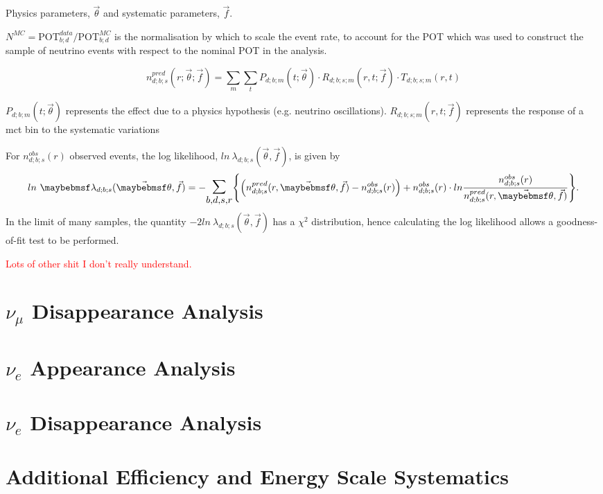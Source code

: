 Physics parameters, $\vec{\theta}$ and systematic parameters, $\vec{f}$.

$N^{MC} = \mbox{POT}_{b;d}^{data}/\mbox{POT}_{b;d}^{MC}$ is the normalisation by which to scale the event rate, to account for the POT which was used to construct the sample of neutrino events with respect to the nominal POT in the analysis.

\begin{equation}
n_{d;b;s}^{pred}(r; \vec{\theta}; \vec{f}) =
   \sum_{m} \sum_{t}  P_{d;b;m}(t; \vec{\theta}) \cdot R_{d;b;s;m}(r,t; \vec{f}) \cdot T_{d;b;s;m}(r,t)
\label{eq:valor_npred}
\end{equation}

$P_{d;b;m}(t; \vec{\theta})$ represents the effect due to a physics hypothesis (e.g. neutrino oscillations).
$R_{d;b;s;m}(r,t; \vec{f})$ represents the response of a \gls{mct} bin to the systematic variations


 For $n_{d ; b ; s}^{obs}(r)$ observed events, the log likelihood, $ln~\lambda_{d;b;s}(\vec \theta, \vec f)$, is given by
\begin{equation}
    ln~\lambda_{d;b;s}(\vec \theta, \vec f) = - \mathlarger{\mathlarger{\sum_{b,d,s,r}}} \Bigg \{ \Big (n_{d;b;s}^{pred}(r,\vec{\theta},\vec{f})
    - n_{d ; b ; s}^{obs}(r) \Big) + n_{d ; b ; s}^{obs}(r) \cdot ln \frac{n_{d ; b ; s}^{obs}(r)}{n_{d ; b ; s}^{p r e d}(r , \vec{\theta} , \vec{f})} \Bigg \}.
\end{equation}
In the limit of many samples, the quantity $-2ln~\lambda_{d;b;s}(\vec \theta, \vec f)$ has a $\chi^2$ distribution, hence calculating the log likelihood allows a goodness-of-fit test to be performed. 

\textcolor{red}{Lots of other shit I don't really understand.}


\section{\texorpdfstring{$\nu_\mu$ Disappearance Analysis}{numu Disappearance Analysis}}
\section{\texorpdfstring{$\nu_e$ Appearance Analysis}{nue Appearance Analysis}}
\section{\texorpdfstring{$\nu_e$ Disappearance Analysis}{nue Disappearance Analysis}}
\section{Additional Efficiency and Energy Scale Systematics}


